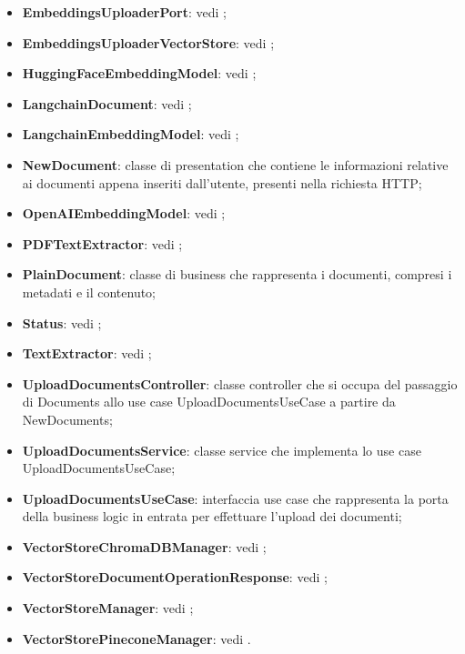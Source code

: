 \documentclass[10pt, a4paper]{article}
\begin{document}
\begin{itemize}
    \item \textbf{EmbeddingsUploaderPort}: vedi ;
    \item \textbf{EmbeddingsUploaderVectorStore}: vedi ;
    \item \textbf{HuggingFaceEmbeddingModel}: vedi ;
    \item \textbf{LangchainDocument}: vedi ;
    \item \textbf{LangchainEmbeddingModel}: vedi ;
    \item \label{NewDocument}\textbf{NewDocument}: classe di presentation che contiene le informazioni relative ai documenti appena inseriti dall'utente, presenti nella richiesta HTTP;
    \item \textbf{OpenAIEmbeddingModel}: vedi ;
    \item \textbf{PDFTextExtractor}: vedi ;
    \item \label{PlainDocument}\textbf{PlainDocument}: classe di business che rappresenta i documenti, compresi i metadati e il contenuto;
    \item \textbf{Status}: vedi ;
    \item \textbf{TextExtractor}: vedi ;
    \item \label{UploadDocumentsController}\textbf{UploadDocumentsController}: classe controller che si occupa del passaggio di Documents allo use case UploadDocumentsUseCase a partire da NewDocuments;
    \item \label{UploadDocumentsService}\textbf{UploadDocumentsService}: classe service che implementa lo use case UploadDocumentsUseCase;
    \item \label{UploadDocumentsUseCase}\textbf{UploadDocumentsUseCase}: interfaccia use case che rappresenta la porta della business logic in entrata per effettuare l'upload dei documenti;
    \item \textbf{VectorStoreChromaDBManager}: vedi ;
    \item \textbf{VectorStoreDocumentOperationResponse}: vedi ;
    \item \textbf{VectorStoreManager}: vedi ;
    \item \textbf{VectorStorePineconeManager}: vedi .
    
\end{itemize}
\end{document}

